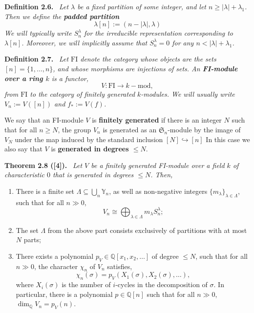 \documentclass[10pt,a4paper]{article}
\newenvironment{sourceblock}[1]{\par\medskip\noindent\textbf{#1.}\ \itshape}{\par\medskip}
\begin{document}
\begin{sourceblock}{Definition 2.6}
Let $\lambda$ be a fixed partition of some integer, and let $n\geq |\lambda|+\lambda_1$. Then we define the \textbf{padded partition}
\[
 \lambda[n]:=(n-|\lambda|,\lambda)
\]
We will typically write $S_n^\lambda$ for the irreducible representation corresponding to $\lambda[n]$. Moreover, we will implicitly assume that $S_n^\lambda=0$ for any $n<|\lambda|+\lambda_1$.
\end{sourceblock}

\begin{sourceblock}{Definition 2.7}
Let $\mathrm{FI}$ denote the category whose objects are the sets $[n]=\{1,\ldots,n\}$, and whose morphisms are injections of sets. An \textbf{FI-module over a ring $k$} is a functor,
\[
 V:\mathrm{FI}\to k-\mathrm{mod},
\]
from $\mathrm{FI}$ to the category of finitely generated $k$-modules. We will usually write $V_n:=V([n])$ and $f_*:=V(f)$.

We say that an FI-module $V$ is \textbf{finitely generated} if there is an integer $N$ such that for all $n\geq N$, the group $V_n$ is generated as an $\mathfrak{S}_n$-module by the image of $V_N$ under the map induced by the standard inclusion $[N]\hookrightarrow[n]$ In this case we also say that $V$ is \textbf{generated in degrees $\leq N$}.
\end{sourceblock}

\begin{sourceblock}{Theorem 2.8 ([4])}
Let $V$ be a finitely generated FI-module over a field $k$ of characteristic $0$ that is generated in degrees $\leq N$. Then,
\begin{enumerate}
\item There is a finite set $\Lambda\subseteq\bigcup_n\mathbb{Y}_n$, as well as non-negative integers $\{m_\lambda\}_{\lambda\in\Lambda}$, such that for all $n\gg0$,
\[
 V_n\cong\bigoplus_{\lambda\in\Lambda}m_\lambda S_n^\lambda;
\]
\item The set $\Lambda$ from the above part consists exclusively of partitions with at most $N$ parts;
\item There exists a polynomial $p_V\in\mathbb{Q}[x_1,x_2,\ldots]$ of degree $\leq N$, such that for all $n\gg0$, the character $\chi_n$ of $V_n$ satisfies,
\[
 \chi_n(\sigma)=p_V(X_1(\sigma),X_2(\sigma),\ldots),
\]
where $X_i(\sigma)$ is the number of $i$-cycles in the decomposition of $\sigma$. In particular, there is a polynomial $p\in\mathbb{Q}[n]$ such that for all $n\gg0$, $\dim_{\mathbb{Q}}V_n=p_V(n)$.
\end{enumerate}
\end{sourceblock}
\end{document}
